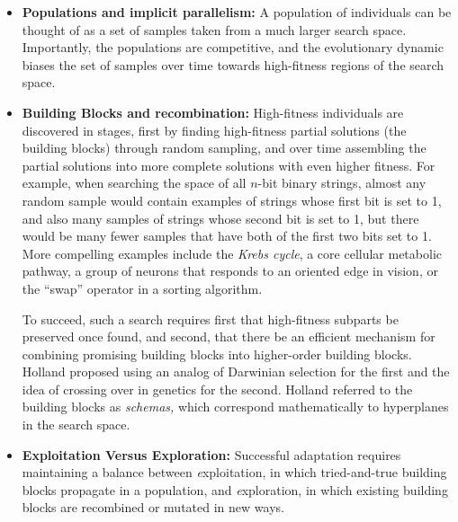 \documentclass{sig-alternate}
\begin{document}
\begin{itemize}
\item{\bf Populations and implicit parallelism:} A population of
  individuals can be thought of as a set of samples taken from a much larger
  search space.  Importantly, the populations are competitive, and
  the evolutionary dynamic biases the set of samples
  over time towards high-fitness regions of the search space. 


\item{\bf Building Blocks and recombination:} High-fitness individuals
  are discovered in stages, first by finding high-fitness partial
  solutions (the building blocks) through random sampling, and over
  time assembling the partial solutions into more complete solutions
  with even higher fitness.  For example, when searching the space of
  all $n$-bit binary strings, almost any random sample would contain
  examples of strings whose first bit is set to 1, and also many
  samples of strings whose second bit is set to 1, but there would be
  many fewer samples that have both of the first two bits set to
  1.  More compelling examples include the \emph{Krebs cycle}, a core
  cellular metabolic pathway, a group of neurons that responds to an
  oriented edge in vision, or the ``swap'' operator in a sorting
  algorithm.  

 To succeed, such a search requires first that
  high-fitness subparts be preserved once found, and second, that
  there be an efficient mechanism for combining promising building
  blocks into higher-order building blocks.  Holland proposed using an
  analog of Darwinian selection for the first and the idea of crossing
  over in genetics for the second.  Holland referred to the building
  blocks as \emph{schemas,} which correspond mathematically to hyperplanes in the
  search space.



\item{\bf Exploitation Versus Exploration:} Successful adaptation
  requires maintaining a balance between {\emph exploitation}, in which
  tried-and-true building blocks propagate in a population, and {\emph
    exploration}, in which existing building blocks are recombined or
  mutated in new ways.  
\end{itemize}
\end{document}
